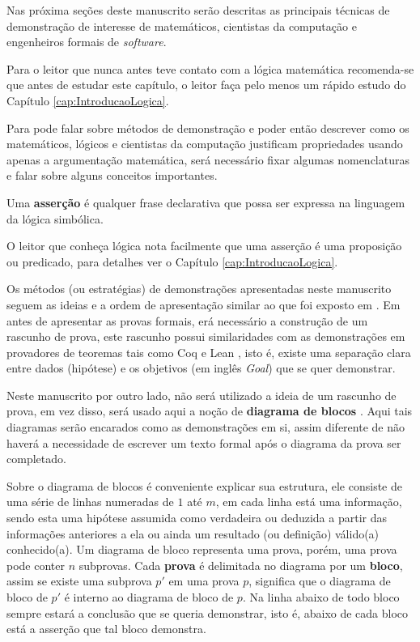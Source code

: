 Nas próxima seções deste manuscrito serão descritas as principais técnicas de demonstração de interesse de matemáticos, cientistas da computação e engenheiros formais de \textit{software}. 

\begin{remark}
	Para o leitor que nunca antes teve contato com a lógica matemática recomenda-se que antes de estudar este capítulo, o leitor faça pelo menos um rápido estudo do Capítulo \ref{cap:IntroducaoLogica}.
\end{remark}

Para pode falar sobre métodos de demonstração e poder então descrever como os matemáticos, lógicos e cientistas da computação justificam propriedades usando apenas a argumentação matemática, será necessário fixar algumas nomenclaturas e falar sobre alguns conceitos importantes.

\begin{definition}[Asserção]\label{def:Assercao}
	Uma \textbf{asserção} é qualquer frase declarativa que possa ser expressa na linguagem da lógica simbólica.
\end{definition}

\begin{remark}
	O leitor que conheça lógica nota facilmente que uma asserção é uma proposição ou predicado, para detalhes ver o Capítulo \ref{cap:IntroducaoLogica}.
\end{remark}

Os métodos (ou estratégias) de demonstrações apresentadas neste manuscrito seguem as ideias e a ordem  de apresentação similar ao que foi exposto em \cite{velleman2019comProvar}. Em \cite{velleman2019comProvar} antes de apresentar as provas formais, erá necessário a construção de um rascunho de prova, este rascunho possui similaridades com as demonstrações em provadores de teoremas tais como Coq \cite{coq2013, softwarefoundations} e Lean \cite{lean2015}, isto é, existe uma separação clara entre dados (hipótese) e os objetivos (em inglês \textit{Goal}) que se quer demonstrar. 

Neste manuscrito por outro lado, não será utilizado a ideia de um rascunho de prova, em vez disso, será usado aqui a noção de \textbf{diagrama de blocos} \cite{broda2007}. Aqui tais diagramas serão encarados como as demonstrações em si, assim diferente de \cite{velleman2019comProvar} não haverá a necessidade de escrever um texto formal após o diagrama da prova ser completado.

Sobre o diagrama de blocos é conveniente explicar sua estrutura, ele consiste de uma série de linhas numeradas de $1$ até $m$, em cada linha está uma informação, sendo esta uma hipótese assumida como verdadeira ou deduzida a partir das informações anteriores a ela ou ainda um resultado (ou definição) válido(a) conhecido(a). Um diagrama de bloco representa uma prova, porém, uma prova pode conter $n$ subprovas. Cada \textbf{prova} é delimitada no diagrama por um \textbf{bloco}, assim se existe uma subprova $p'$ em uma prova $p$, significa que o diagrama de bloco de $p'$ é interno ao diagrama de bloco de $p$. Na linha abaixo de todo bloco sempre estará a conclusão que se queria demonstrar, isto é, abaixo de cada bloco está a asserção que tal bloco demonstra.

